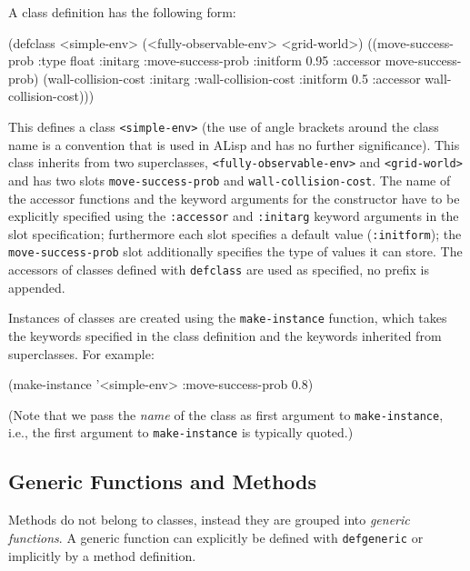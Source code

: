 \documentclass[a4paper]{amsart}
\begin{document}
A class definition has the following form:
\begin{Code}
  (defclass <simple-env> (<fully-observable-env> <grid-world>)
    ((move-success-prob :type float
                        :initarg :move-success-prob :initform 0.95
                        :accessor move-success-prob)
     (wall-collision-cost :initarg :wall-collision-cost :initform 0.5
                          :accessor wall-collision-cost)))
\end{Code}
This defines a class \verb|<simple-env>| (the use of angle brackets
around the class name is a convention that is used in ALisp and has no
further significance).  This class inherits from two superclasses,
\verb|<fully-observable-env>| and \verb|<grid-world>| and has two
slots \texttt{move-success-prob} and \texttt{wall-collision-cost}.
The name of the accessor functions and the keyword arguments for the
constructor have to be explicitly specified using the
\texttt{:accessor} and \texttt{:initarg} keyword arguments in the slot
specification; furthermore each slot specifies a default value
(\texttt{:initform}); the \texttt{move-success-prob} slot additionally
specifies the type of values it can store.  The accessors of classes
defined with \texttt{defclass} are used as specified, no prefix is
appended.

Instances of classes are created using the \texttt{make-instance}
function, which takes the keywords specified in the class definition
and the keywords inherited from superclasses.  For example:
\begin{Code}
  (make-instance '<simple-env> :move-success-prob 0.8)
\end{Code}
(Note that we pass the \emph{name} of the class as first argument to
\texttt{make-instance}, i.e., the first argument to
\texttt{make-instance} is typically quoted.)

\subsection{Generic Functions and Methods}
\label{sec:gener-funct-meth}

Methods do not belong to classes, instead they are grouped into
\emph{generic functions}.  A generic function can explicitly be
defined with \texttt{defgeneric} or implicitly by a method definition.
\end{document}
